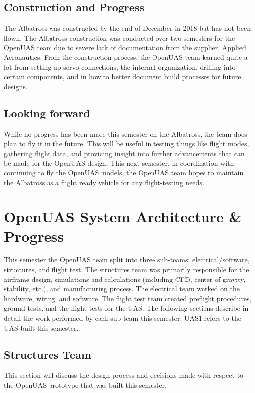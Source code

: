 \documentclass{article}
\begin{document}
\subsection{Construction and Progress}
The Albatross was constructed by the end of December in 2018 but has not been flown. The Albatross construction was conducted over two semesters for the OpenUAS team due to severe lack of documentation from the supplier, Applied Aeronautics. From the construction process, the OpenUAS team learned quite a lot from setting up servo connections, the internal organization, drilling into certain components, and in how to better document build processes for future designs. 

\subsection{Looking forward}

While no progress has been made this semester on the Albatross, the team does plan to fly it in the future. This will be useful in testing things like flight modes, gathering flight data, and providing insight into further advancements that can be made for the OpenUAS design. This next semester, in coordination with continuing to fly the OpenUAS models, the OpenUAS team hopes to maintain the Albatross as a flight ready vehicle for any flight-testing needs. 

\section{OpenUAS System Architecture \& Progress}
This semester the OpenUAS team split into three sub-teams: electrical/software, structures, and flight test. The structures team was primarily responsible for the airframe design, simulations and calculations (including CFD, center of gravity, stability, etc.), and manufacturing process. The electrical team worked on the hardware, wiring, and software. The flight test team created preflight procedures, ground tests, and the flight tests for the UAS. The following sections describe in detail the work performed by each sub-team this semester. UAS1 refers to the UAS built this semester.  

\subsection{Structures Team}
This section will discuss the design process and decisions made with respect to the OpenUAS prototype that was built this semester.
\end{document}
